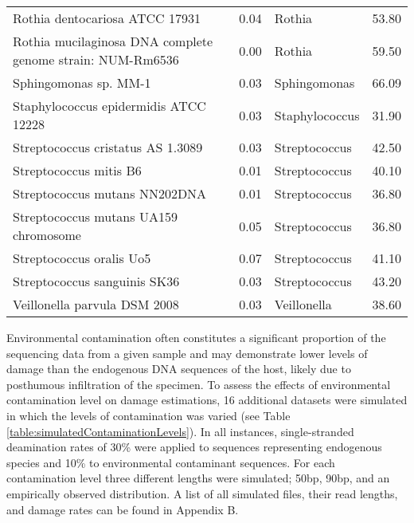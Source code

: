 \documentclass[12pt, a4paper]{article}
\begin{document}
\begin{table}[ht]
\begin{tabular}{C{7.5cm} C{2.5cm} C{3cm} C{1.5cm} }
	Rothia dentocariosa ATCC 17931 & 0.04 & Rothia & 53.80 \\ 
	Rothia mucilaginosa DNA complete genome strain: NUM-Rm6536 & 0.00 & Rothia & 59.50 \\ 
	Sphingomonas sp. MM-1 & 0.03 & Sphingomonas & 66.09 \\ 
	Staphylococcus epidermidis ATCC 12228 & 0.03 & Staphylococcus & 31.90 \\ 
	Streptococcus cristatus AS 1.3089 & 0.03 & Streptococcus & 42.50 \\ 
	Streptococcus mitis B6 & 0.01 & Streptococcus & 40.10 \\ 
	Streptococcus mutans NN202DNA & 0.01 & Streptococcus & 36.80 \\ 
	Streptococcus mutans UA159 chromosome & 0.05 & Streptococcus & 36.80 \\ 
	Streptococcus oralis Uo5 & 0.07 & Streptococcus & 41.10 \\ 
	Streptococcus sanguinis SK36 & 0.03 & Streptococcus & 43.20 \\ 
	Veillonella parvula DSM 2008 & 0.03 & Veillonella & 38.60 \\ 
   \hline
\end{tabular}
\end{table}
\clearpage

Environmental contamination often constitutes a significant proportion of the sequencing data from a given sample and may demonstrate lower levels of damage than the endogenous DNA sequences of the host, likely due to posthumous infiltration of the specimen. 
To assess the effects of environmental contamination level on damage estimations, 16 additional datasets were simulated in which the levels of contamination was varied (see Table \ref{table:simulatedContaminationLevels}). 
In all instances, single-stranded deamination rates of 30\% were applied to sequences representing endogenous species and 10\% to environmental contaminant sequences.  
For each contamination level three different lengths were simulated; 50bp, 90bp, and an empirically observed distribution. A list of all simulated files, their read lengths, and damage rates can be found in Appendix B.\\
\end{document}

